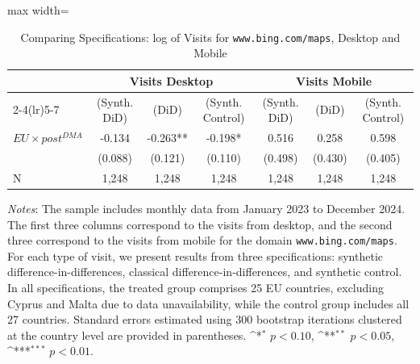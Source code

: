\documentclass[11pt]{article}
\begin{document}
	\clearpage
	
	
	\begin{table}[ht!]
		\centering
		\def\sym#1{\ifmmode^{#1}\else\(^{#1}\)\fi}
		\caption{\label{tab:sdid_traffic_bing} Comparing Specifications: log of Visits for \texttt{www.bing.com/maps}, Desktop and Mobile}
		\begin{threeparttable}
			\begin{adjustbox}{max width=\linewidth}
				\begin{tabular}{lcccccc}
					\hline \noalign{\smallskip} 
					& \multicolumn{3}{c}{Visits Desktop} & \multicolumn{3}{c}{Visits Mobile}  \\ \cmidrule(lr){2-4}\cmidrule(lr){5-7}
				
				&(Synth. DiD)   &       (DiD)   &(Synth. Control)   &(Synth. DiD)   &       (DiD)   &(Synth. Control)   \\
				\midrule
				$ EU \times post^{DMA} $ &      -0.134   &      -0.263** &      -0.198*  &       0.516   &       0.258   &       0.598   \\
				&     (0.088)   &     (0.121)   &     (0.110)   &     (0.498)   &     (0.430)   &     (0.405)   \\
				
				N                   &       1,248   &       1,248   &       1,248   &       1,248   &       1,248   &       1,248   \\
				\midrule
				
				\end{tabular}
			\end{adjustbox}
			\begin{tablenotes}
				\item \footnotesize \emph{Notes}: The sample includes monthly data from January 2023 to December 2024. The first three columns correspond to the visits from desktop, and the second three correspond to the visits from mobile for the domain \texttt{www.bing.com/maps}. For each type of visit, we present results from three specifications: synthetic difference-in-differences, classical difference-in-differences, and synthetic control. In all specifications, the treated group comprises 25 EU countries, excluding Cyprus and Malta due to data unavailability, while the control group includes all 27 countries. Standard errors estimated using 300 bootstrap iterations clustered at the country level are provided in parentheses. \sym{*} \(p<0.10\), \sym{**} \(p<0.05\), \sym{***}  \(p<0.01\). 
			\end{tablenotes}
		\end{threeparttable}
	\end{table}
	
\end{document}
